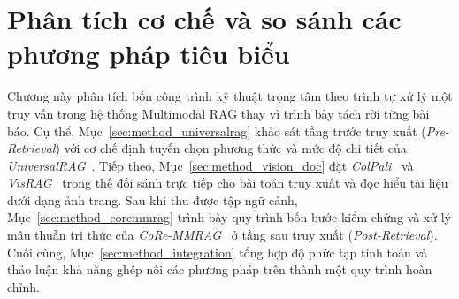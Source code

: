 
\chapter{Phân tích cơ chế và so sánh các phương pháp tiêu biểu}
\label{chap:methods}

Chương này phân tích bốn công trình kỹ thuật trọng tâm theo trình tự xử lý một truy vấn trong hệ thống Multimodal RAG thay vì trình bày tách rời từng bài báo. Cụ thể, Mục~\ref{sec:method_universalrag} khảo sát tầng trước truy xuất (\textit{Pre-Retrieval}) với cơ chế định tuyến chọn phương thức và mức độ chi tiết của \textit{UniversalRAG}~\cite{yeo2026universalrag}. Tiếp theo, Mục~\ref{sec:method_vision_doc} đặt \textit{ColPali}~\cite{faysse2025colpali} và \textit{VisRAG}~\cite{yu2025visrag} trong thế đối sánh trực tiếp cho bài toán truy xuất và đọc hiểu tài liệu dưới dạng ảnh trang. Sau khi thu được tập ngữ cảnh, Mục~\ref{sec:method_coremmrag} trình bày quy trình bốn bước kiểm chứng và xử lý mâu thuẫn tri thức của \textit{CoRe-MMRAG}~\cite{tian2025coremmrag} ở tầng sau truy xuất (\textit{Post-Retrieval}). Cuối cùng, Mục~\ref{sec:method_integration} tổng hợp độ phức tạp tính toán và thảo luận khả năng ghép nối các phương pháp trên thành một quy trình hoàn chỉnh.





